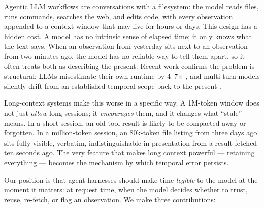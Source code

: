 \documentclass[10pt]{article}
\begin{document}
Agentic LLM workflows are conversations with a filesystem: the model reads files,
runs commands, searches the web, and edits code, with every observation appended to a
context window that may live for hours or days. This design has a hidden cost. A
model has no intrinsic sense of elapsed time; it only knows what the text says. When
an observation from yesterday sits next to an observation from two minutes ago, the
model has no reliable way to tell them apart, so it often treats both as describing
the present. Recent work confirms the problem is structural: LLMs misestimate their
own runtime by 4--7$\times$ \cite{perceive_time}, and multi-turn models silently
drift from an established temporal scope back to the present \cite{chronoscope}.

Long-context systems make this worse in a specific way. A 1M-token window does not
just \emph{allow} long sessions; it \emph{encourages} them, and it changes what
``stale'' means. In a short session, an old tool result is likely to be compacted
away or forgotten. In a million-token session, an 80k-token file listing from three
days ago sits fully visible, verbatim, indistinguishable in presentation from a
result fetched ten seconds ago. The very feature that makes long context powerful
--- retaining everything --- becomes the mechanism by which temporal error persists.

Our position is that agent harnesses should make time \emph{legible} to the model at
the moment it matters: at request time, when the model decides whether to trust,
reuse, re-fetch, or flag an observation. We make three contributions:
\end{document}
